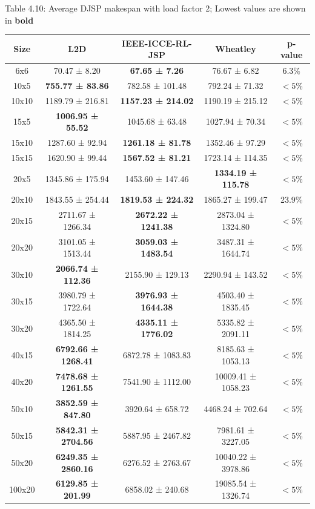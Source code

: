 \begin{table}
    Table 4.10: Average DJSP makespan with load factor 2; Lowest values are shown in \textbf{bold}\\
    \vspace{1mm}
    \label{table:4.7}
    \footnotesize 
    \begin{tabular}{ccccc}
    \toprule
    Size & L2D & IEEE-ICCE-RL-JSP & Wheatley & p-value \\
    \midrule
    6x6 & 70.47 ± 8.20 & \textbf{67.65 ± 7.26} & 76.67 ± 6.82 & 6.3$\%$ \\
    10x5 & \textbf{755.77 ± 83.86} & 782.58 ± 101.48 & 792.24 ± 71.32 & $< 5\%$ \\
    10x10 & 1189.79 ± 216.81 & \textbf{1157.23 ± 214.02} & 1190.19 ± 215.12 & $< 5\%$ \\
    15x5 & \textbf{1006.95 ± 55.52} & 1045.68 ± 63.48 & 1027.94 ± 70.34 & $< 5\%$ \\
    15x10 & 1287.60 ± 92.94 & \textbf{1261.18 ± 81.78} & 1352.46 ± 97.29 & $< 5\%$ \\
    15x15 & 1620.90 ± 99.44 & \textbf{1567.52 ± 81.21} & 1723.14 ± 114.35 & $< 5\%$ \\
    20x5 & 1345.86 ± 175.94 & 1453.60 ± 147.46 & \textbf{1334.19 ± 115.78} & $< 5\%$ \\
    20x10 & 1843.55 ± 254.44 & \textbf{1819.53 ± 224.32} & 1865.27 ± 199.47 & 23.9$\%$ \\
    20x15 & 2711.67 ± 1266.34 & \textbf{2672.22 ± 1241.38} & 2873.04 ± 1324.80 & $< 5\%$ \\
    20x20 & 3101.05 ± 1513.44 & \textbf{3059.03 ± 1483.54} & 3487.31 ± 1644.74 & $< 5\%$ \\
    30x10 & \textbf{2066.74 ± 112.36} & 2155.90 ± 129.13 & 2290.94 ± 143.52 & $< 5\%$ \\
    30x15 & 3980.79 ± 1722.64 & \textbf{3976.93 ± 1644.38} & 4503.40 ± 1835.45 & $< 5\%$ \\
    30x20 & 4365.50 ± 1814.25 & \textbf{4335.11 ± 1776.02} & 5335.82 ± 2091.11 & $< 5\%$ \\
    40x15 & \textbf{6792.66 ± 1268.41} & 6872.78 ± 1083.83 & 8185.63 ± 1053.13 & $< 5\%$ \\
    40x20 & \textbf{7478.68 ± 1261.55} & 7541.90 ± 1112.00 & 10009.41 ± 1058.23 & $< 5\%$ \\
    50x10 & \textbf{3852.59 ± 847.80} & 3920.64 ± 658.72 & 4468.24 ± 702.64 & $< 5\%$ \\
    50x15 & \textbf{5842.31 ± 2704.56} & 5887.95 ± 2467.82 & 7981.61 ± 3227.05 & $< 5\%$ \\
    50x20 & \textbf{6249.35 ± 2860.16} & 6276.52 ± 2763.67 & 10040.22 ± 3978.86 & $< 5\%$ \\
    100x20 & \textbf{6129.85 ± 201.99} & 6858.02 ± 240.68 & 19085.54 ± 1326.74 & $< 5\%$ \\
    \bottomrule
    \end{tabular}
\end{table}
    
